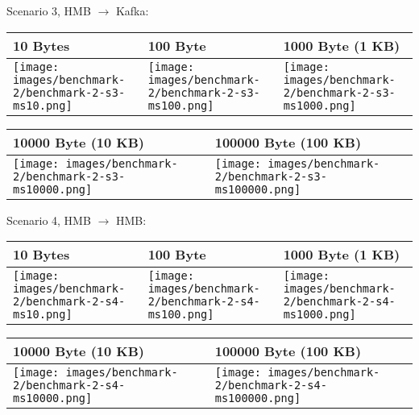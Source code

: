 \newpage
Scenario 3, HMB $\rightarrow$ Kafka:

\begin{table}[H]
\centering
\begin{tabular}{|l|l|l|} \hline
10 Bytes & 100 Byte & 1000 Byte (1 KB)\\ \hline
\texttt{[image: images/benchmark-2/benchmark-2-s3-ms10.png]}
&
\texttt{[image: images/benchmark-2/benchmark-2-s3-ms100.png]}
&
\texttt{[image: images/benchmark-2/benchmark-2-s3-ms1000.png]} \\ \hline
\end{tabular}
\end{table}

\begin{table}[H]
\centering
\begin{tabular}{|l|l|} \hline
10000 Byte (10 KB) & 100000 Byte (100 KB)\\ \hline
\texttt{[image: images/benchmark-2/benchmark-2-s3-ms10000.png]}
&
\texttt{[image: images/benchmark-2/benchmark-2-s3-ms100000.png]} \\ \hline
\end{tabular}
\end{table}

Scenario 4, HMB $\rightarrow$ HMB:

\begin{table}[H]
\centering
\begin{tabular}{|l|l|l|} \hline
10 Bytes & 100 Byte & 1000 Byte (1 KB)\\ \hline
\texttt{[image: images/benchmark-2/benchmark-2-s4-ms10.png]}
&
\texttt{[image: images/benchmark-2/benchmark-2-s4-ms100.png]}
&
\texttt{[image: images/benchmark-2/benchmark-2-s4-ms1000.png]} \\ \hline
\end{tabular}
\end{table}

\begin{table}[H]
\centering
\begin{tabular}{|l|l|} \hline
10000 Byte (10 KB) & 100000 Byte (100 KB)\\ \hline
\texttt{[image: images/benchmark-2/benchmark-2-s4-ms10000.png]}
&
\texttt{[image: images/benchmark-2/benchmark-2-s4-ms100000.png]} \\ \hline
\end{tabular}
\end{table}

